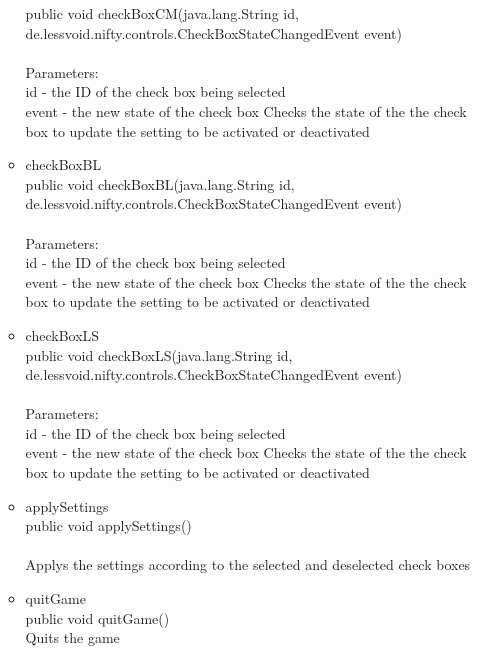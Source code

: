 \documentclass[letterpaper]{article}
\begin{document}
\begin{itemize}
\begin{itemize}
													public void checkBoxCM(java.lang.String id, \\
				              de.lessvoid.nifty.controls.CheckBoxStateChangedEvent event) \\ \\
													Parameters: \\
													id - the ID of the check box being selected \\
													event - the new state of the check box Checks the state of the the check box to update the setting to be activated or deactivated
											\item	checkBoxBL \\
													public void checkBoxBL(java.lang.String id, \\
				              de.lessvoid.nifty.controls.CheckBoxStateChangedEvent event) \\ \\
													Parameters: \\
													id - the ID of the check box being selected \\
													event - the new state of the check box Checks the state of the the check box to update the setting to be activated or deactivated
											\item	checkBoxLS \\
													public void checkBoxLS(java.lang.String id, \\
				              de.lessvoid.nifty.controls.CheckBoxStateChangedEvent event) \\ \\
													Parameters: \\
													id - the ID of the check box being selected \\
													event - the new state of the check box Checks the state of the the check box to update the setting to be activated or deactivated
											\item	applySettings \\
													public void applySettings() \\ \\
													Applys the settings according to the selected and deselected check boxes
											\item	quitGame \\
													public void quitGame() \\
													Quits the game
										\end{itemize}
							\end{itemize}
					
\end{document}

